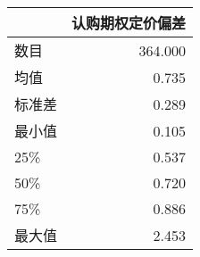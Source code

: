 \begin{tabular}{lr}
\toprule
{} &  认购期权定价偏差 \\
\midrule
数目 &   364.000 \\
均值  &     0.735 \\
标准差   &     0.289 \\
最小值   &     0.105 \\
25\%   &     0.537 \\
50\%   &     0.720 \\
75\%   &     0.886 \\
最大值   &     2.453 \\
\bottomrule
\end{tabular}
